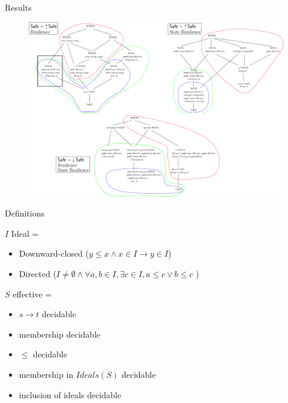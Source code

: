 \documentclass{beamer}
\begin{document}
  \begin{frame}{Results}
 
   \begin{center}
 	\begin{figure}
 	\vspace{-0.25cm}
\includegraphics[width=1.00\textwidth]{resultA}
	\end{figure}
\end{center}  

  \end{frame}
  \begin{frame}{Definitions}
  

$I$ Ideal =
\begin{itemize}
 \item Downward-closed %
 ($y \leq x  \wedge x \in I \to y \in I$) 
 \item Directed %
 ($I \neq \emptyset \wedge \forall a,b \in I, \exists c \in I, a \leq c \vee b \leq c$ )
\end{itemize} 

  
\hspace{-2cm}

$S$ effective = 
 \begin{itemize}
\item $s \to t$ decidable 
\item membership decidable 
\item $\leq$ decidable 
\item membership in $Ideals(S)$ decidable 
\item inclusion of ideals decidable
\end{itemize}



  \end{frame}
\end{document}
